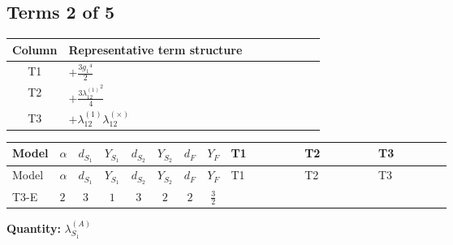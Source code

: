 \documentclass[8pt]{article}
\begin{document}
\begin{landscape}
\subsection*{Terms 2 of 5}
\begin{center}
\begin{tabular}{@{}c >{\raggedright\arraybackslash}p{0.82\linewidth}@{}}
\toprule
Column & Representative term structure \\
\midrule
T1 & \(\displaystyle +\frac{3 {g_1}^4}{2}\) \\
\midrule
T2 & \(\displaystyle +\frac{3 {\lambda_{12}^{(1)}}^2}{4}\) \\
\midrule
T3 & \(\displaystyle +{\lambda_{12}^{(1)}} {\lambda_{12}^{(\times)}}\) \\
\midrule
\bottomrule
\end{tabular}
\end{center}
\smallskip
\tiny
\begin{longtable}{@{}llcccccc >{\raggedright\arraybackslash}p{0.21\linewidth} >{\raggedright\arraybackslash}p{0.21\linewidth} >{\raggedright\arraybackslash}p{0.21\linewidth}@{}}
\toprule
Model & $\alpha$ & $d_{S_1}$ & $Y_{S_1}$ & $d_{S_2}$ & $Y_{S_2}$ & $d_F$ & $Y_F$ & T1 & T2 & T3 \\
\midrule
\endfirsthead
\toprule
Model & $\alpha$ & $d_{S_1}$ & $Y_{S_1}$ & $d_{S_2}$ & $Y_{S_2}$ & $d_F$ & $Y_F$ & T1 & T2 & T3 \\
\midrule
\endhead
T3-E & $2$ & $3$ & $1$ & $3$ & $2$ & $2$ & $\frac{3}{2}$ & \scriptsize\adjustbox{max width=\linewidth}{$\begin{gathered} +\frac{3 {g_1}^4}{2}\end{gathered}$} & \scriptsize\adjustbox{max width=\linewidth}{$\begin{gathered} +\frac{3 {\lambda_{12}^{(1)}}^2}{4}\end{gathered}$} & \scriptsize\adjustbox{max width=\linewidth}{$\begin{gathered} +{\lambda_{12}^{(1)}} {\lambda_{12}^{(\times)}}\end{gathered}$} \\
\midrule
\bottomrule
\end{longtable}
\clearpage
\noindent\textbf{Quantity: }$\lambda_{S_1}^{(A)}$\par\smallskip

\end{landscape}
\end{document}
